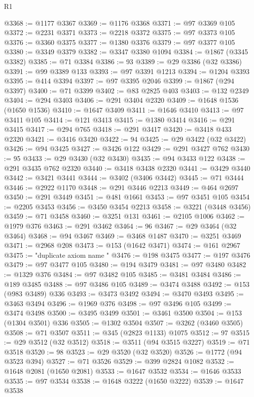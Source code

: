 \begin{lexlean}{R1}
\begin{coremodule}
{{{{{{{{{{{{{{{{{{{{{{{{{{{{{{{{{{{{{{{{{{{{{{{{{{{{{{{{{{{{{{{{{{{{{{{{{{{{{{{{{{{{{{{{{{{{{{{{{{{{{{{{{{{{{{{{{{{{{{{{{{{{{{{{{{{{{{{{{{{{{{{{{{{{{{{{{{{{{{{{{{{{{{{{{{{{{{{{{{{{{{{{{{@3368 := @1177 @3367
@3369 := @1176 @3368
@3371 := @97 @3369 @105
@3372 := @2231 @3371
@3373 := @2218 @3372
@3375 := @97 @3373 @105
@3376 := @3360 @3375
@3377 := @1380 @3376
@3379 := @97 @3377 @105
@3380 := @3349 @3379
@3382 := @3347 @3380 @1094
@3384 := @1867 (@3345 @3382)
@3385 := @71 @3384
@3386 := 93
@3389 := @29 @3386 (@32 @3386)
@3391 := @99 @3389 @133
@3393 := @97 @3391 @1213
@3394 := @1204 @3393
@3395 := @414 @3394
@3397 := @97 @3395 @2046
@3399 := @1867 (@294 @3397)
@3400 := @71 @3399
@3402 := @83 @2825 @403
@3403 := @132 @2349
@3404 := @294 @3403
@3406 := @291 @3404 @2320
@3409 := @1648 @1536 (@1650 @1536)
@3410 := @1647 @3409
@3411 := @1646 @3410
@3413 := @97 @3411 @105
@3414 := @121 @3413
@3415 := @1380 @3414
@3416 := @291 @3415
@3417 := @294 @765
@3418 := @291 @3417
@3420 := @3418 @433 @2320
@3421 := @3416 @3420
@3422 := 94
@3425 := @29 @3422 (@32 @3422)
@3426 := @94 @3425
@3427 := @3426 @122
@3429 := @291 @3427 @762
@3430 := 95
@3433 := @29 @3430 (@32 @3430)
@3435 := @94 @3433 @122
@3438 := @291 @3435 @762 @2320
@3440 := @3418 @3438 @2320
@3441 := @3429 @3440
@3442 := @3421 @3441
@3444 := @3402 (@3406 @3442)
@3445 := @71 @3444
@3446 := @2922 @1170
@3448 := @291 @3446 @2213
@3449 := @464 @2697
@3450 := @291 @3449
@3451 := @481 @1661
@3453 := @97 @3451 @105
@3454 := @2205 @3453
@3456 := @3450 @3454 @2213
@3458 := @3221 (@3448 @3456)
@3459 := @71 @3458
@3460 := @3251 @131
@3461 := @2105 @1006
@3462 := @1979 @376
@3463 := @291 @3462
@3464 := 96
@3467 := @29 @3464 (@32 @3464)
@3468 := @94 @3467
@3469 := @3468 @1487
@3470 := @3251 @3469
@3471 := @2968 @208
@3473 := @153 (@1642 @3471)
@3474 := @161 @2967
@3475 := "duplicate axiom name "
@3476 := @198 @3475
@3477 := @197 @3476
@3479 := @97 @3477 @105
@3480 := @194 @3479
@3481 := @97 @3480
@3482 := @1329 @376
@3484 := @97 @3482 @105
@3485 := @3481 @3484
@3486 := @189 @3485
@3488 := @97 @3486 @105
@3489 := @3474 @3488
@3492 := @153 (@983 @3489) @336
@3493 := @3473 @3492
@3494 := @3470 @3493
@3495 := @3463 @3494
@3496 := @1969 @376
@3498 := @97 @3496 @105
@3499 := @3474 @3498
@3500 := @3495 @3499
@3501 := @3461 @3500
@3504 := @153 (@1304 @3501) @336
@3505 := @1302 @3504
@3507 := @3262 (@3460 @3505)
@3508 := @71 @3507
@3511 := @345 (@2823 @1133) @1075
@3512 := 97
@3515 := @29 @3512 (@32 @3512)
@3518 := @3511 (@94 @3515 @3227)
@3519 := @71 @3518
@3520 := 98
@3523 := @29 @3520 (@32 @3520)
@3526 := @1772 (@94 @3523 @394)
@3527 := @71 @3526
@3529 := @399 @2824 @1082
@3532 := @1648 @2081 (@1650 @2081)
@3533 := @1647 @3532
@3534 := @1646 @3533
@3535 := @97 @3534
@3538 := @1648 @3222 (@1650 @3222)
@3539 := @1647 @3538
}}}}}}}}}}}}}}}}}}}}}}}}}}}}}}}}}}}}}}}}}}}}}}}}}}}}}}}}}}}}}}}}}}}}}}}}}}}}}}}}}}}}}}}}}}}}}}}}}}}}}}}}}}}}}}}}}}}}}}}}}}}}}}}}}}}}}}}}}}}}}}}}}}}}}}}}}}}}}}}}}}}}}}}}}}}}}}}}}}}}}}}}}}
\end{coremodule}
\end{lexlean}
